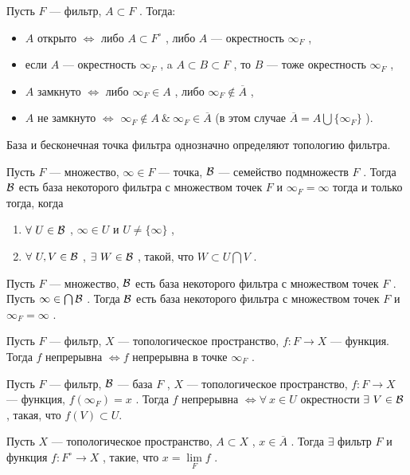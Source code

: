 \SSsect Пусть \( F \) --- фильтр, \( A \subset F \) . Тогда:
\begin{itemize}[label=]
\item \( A \) открыто \( \Leftrightarrow \) либо \( A \subset F^{\circ} \) , либо \( A \) --- окрестность \( \infty_F \) ,
\item если \( A \) --- окрестность \( \infty_F \) , a \( A \subset B \subset F \) , то \( B \) --- тоже окрестность \( \infty_F \) ,
\item \( A \) замкнуто \( \Leftrightarrow \) либо \( \infty_F \in A \) , либо \( \infty_F \notin \overline{A} \) , 
\item \( A \) не замкнуто \( \Leftrightarrow \) \( \infty_F \notin A ~\&~ \infty_F \in \overline{A} \) (в этом случае \( \overline{A} = A \bigcup \{\infty_F\} \) ).
\end{itemize}

\SSsect База и бесконечная точка фильтра однозначно определяют топологию фильтра. 

\SSsect Пусть \( F \) --- множество, \( \infty \in F \) --- точка, \( \mathcal{B} \) --- семейство подмножеств \( F \) . Тогда \( \mathcal{B} \) есть база некоторого фильтра с множеством точек \( F \) и \( \infty_F = \infty \) тогда и только тогда, когда 
\begin{enumerate}[label={\alph*)}]
\item \( \forall~U \in \mathcal{B} \) , \( \infty \in U \) и \( U \neq \{\infty\} \) ,  
\item \( \forall~U,V \in \mathcal{B} \) , \( \exists~W \in \mathcal{B} \) , такой, что \( W \subset U\bigcap V \) .
\end{enumerate}

\SSsect Пусть \( F \) --- множество, \( \mathcal{B} \) есть база некоторого фильтра с множеством точек \( F \) . Пусть \( \infty \in \bigcap \mathcal{B} \) . Тогда \( \mathcal{B} \) есть база некоторого фильтра с множеством точек \( F \) и \( \infty_F = \infty \) .

\SSsect Пусть \( F \) --- фильтр, \( X \) --- топологическое пространство, \( f: F \rightarrow X \) --- функция. Тогда \( f \) непрерывна \( \Leftrightarrow f \) непрерывна в точке \( \infty_F \) .

\SSsect Пусть \( F \) --- фильтр, \( \mathcal{B} \) --- база \( F \) , \( X \) --- топологическое пространство, \( f: F \rightarrow X \) --- функция, \( f(\infty_F)=x \) . Тогда \( f \) непрерывна \( \Leftrightarrow \forall~x \in U \) окрестности \( \exists~V \in \mathcal{B} \) , такая, что \( f(V) \subset U \).

\SSsect[!] Пусть \( X \) --- топологическое пространство, \( A \subset X \) , \( x \in \overline{A} \) . Тогда \( \exists \) фильтр \( F \) и функция \( f: F^\circ \rightarrow X \) , такие, что \( x = \lim\limits_{F} f \) .

